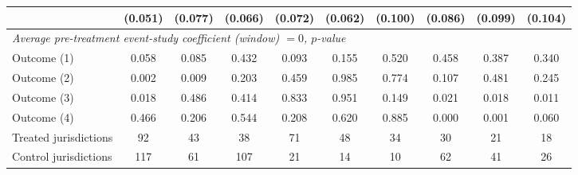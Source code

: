 \begin{adjustbox}{max width=\textwidth}
\begin{tabular}{l*{9}{c}}
 & (0.051) & (0.077) & (0.066) & (0.072) & (0.062) & (0.100) & (0.086) & (0.099) & (0.104) \\
\midrule
\multicolumn{10}{l}{\emph{Average pre-treatment event-study coefficient (window) $=0$, $p$-value}} \\
\hspace{.4cm} Outcome (1) & 0.058 & 0.085 & 0.432 & 0.093 & 0.155 & 0.520 & 0.458 & 0.387 & 0.340 \\
\hspace{.4cm} Outcome (2) & 0.002 & 0.009 & 0.203 & 0.459 & 0.985 & 0.774 & 0.107 & 0.481 & 0.245 \\
\hspace{.4cm} Outcome (3) & 0.018 & 0.486 & 0.414 & 0.833 & 0.951 & 0.149 & 0.021 & 0.018 & 0.011 \\
\hspace{.4cm} Outcome (4) & 0.466 & 0.206 & 0.544 & 0.208 & 0.620 & 0.885 & 0.000 & 0.001 & 0.060 \\
\midrule
Treated jurisdictions & 92 & 43 & 38 & 71 & 48 & 34 & 30 & 21 & 18 \\
Control jurisdictions & 117 & 61 & 107 & 21 & 14 & 10 & 62 & 41 & 26 \\
\bottomrule
\end{tabular}
\end{adjustbox}
